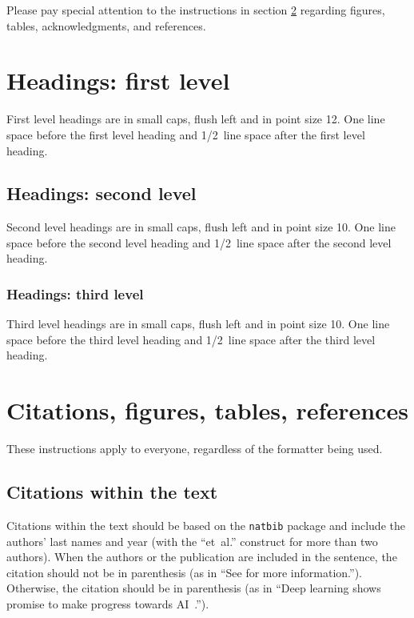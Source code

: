\documentclass{article} %
\begin{document}
Please pay special attention to the instructions in section \ref{others}
regarding figures, tables, acknowledgments, and references.

\section{Headings: first level}
\label{headings}

First level headings are in small caps,
flush left and in point size 12. One line space before the first level
heading and 1/2~line space after the first level heading.

\subsection{Headings: second level}

Second level headings are in small caps,
flush left and in point size 10. One line space before the second level
heading and 1/2~line space after the second level heading.

\subsubsection{Headings: third level}

Third level headings are in small caps,
flush left and in point size 10. One line space before the third level
heading and 1/2~line space after the third level heading.

\section{Citations, figures, tables, references}
\label{others}

These instructions apply to everyone, regardless of the formatter being used.

\subsection{Citations within the text}

Citations within the text should be based on the \texttt{natbib} package
and include the authors' last names and year (with the ``et~al.'' construct
for more than two authors). When the authors or the publication are
included in the sentence, the citation should not be in parenthesis (as
in ``See \citet{Hinton06} for more information.''). Otherwise, the citation
should be in parenthesis (as in ``Deep learning shows promise to make progress towards AI~\citep{Bengio+chapter2007}.'').
\end{document}

